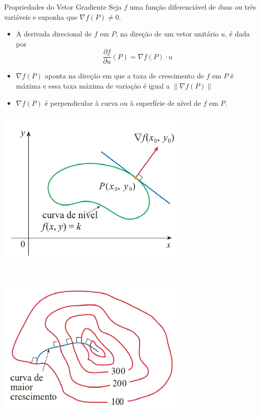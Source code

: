 \begin{frame}[label=der-parciais]
\begin{block}{Propriedades do Vetor Gradiente}
Seja $f$ uma função diferenciável de duas ou três
variáveis e suponha que $\nabla f(P)\neq 0$.

\begin{itemize}
\item A derivada direcional de $f$ em $P$, na direção de um {\color{red}vetor unitário} $u$, é dada por
\[\frac{\partial f}{\partial u}(P)=\nabla f(P)\cdot u\]
\item $\nabla f(P)$ aponta na direção em que a taxa de crescimento de $f$ em $P$ é máxima e essa taxa máxima de variação é igual a $\|\nabla f(P)\|$

\item $\nabla f(P)$ é perpendicular à curva ou à superfície de nível de $f$ em $P$.
 \end{itemize}
\end{block}


\end{frame}

\begin{frame}[label=der-parciais]
\begin{center}
\begin{minipage}{0.5\textwidth}
\includegraphics[scale=.6]{figuras/grad1.png}
\end{minipage}\ \ \ \
\begin{minipage}{0.4\textwidth}
\includegraphics[scale=.6]{figuras/grad2.png}
\end{minipage}
\end{center}
\end{frame}


